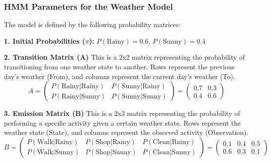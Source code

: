 \documentclass[aspectratio=43, 9pt]{beamer}
\begin{document}
\begin{frame}
    \frametitle{HMM Parameters for the Weather Model}
    The model is defined by the following probability matrices:
    
    \textbf{1. Initial Probabilities ($\pi$):}
        $P(\text{Rainy}) = 0.6$, $P(\text{Sunny}) = 0.4$
    
    \textbf{2. Transition Matrix (A)}
    This is a 2x2 matrix representing the probability of transitioning from one weather state to another. Rows represent the previous day's weather (From), and columns represent the current day's weather (To).
    $$
    A = \begin{pmatrix}
    P(\text{Rainy}|\text{Rainy}) & P(\text{Sunny}|\text{Rainy}) \\
    P(\text{Rainy}|\text{Sunny}) & P(\text{Sunny}|\text{Sunny})
    \end{pmatrix}
    =
    \begin{pmatrix}
    0.7 & 0.3 \\
    0.4 & 0.6
    \end{pmatrix}
    $$
    
    \textbf{3. Emission Matrix (B)}
    This is a 2x3 matrix representing the probability of performing a specific activity given a certain weather state. Rows represent the weather state (State), and columns represent the observed activity (Observation).
    $$
    B = \begin{pmatrix}
    P(\text{Walk}|\text{Rainy}) & P(\text{Shop}|\text{Rainy}) & P(\text{Clean}|\text{Rainy}) \\
    P(\text{Walk}|\text{Sunny}) & P(\text{Shop}|\text{Sunny}) & P(\text{Clean}|\text{Sunny})
    \end{pmatrix}
    =
    \begin{pmatrix}
    0.1 & 0.4 & 0.5 \\
    0.6 & 0.3 & 0.1
    \end{pmatrix}
    $$
\end{frame}
\end{document}
